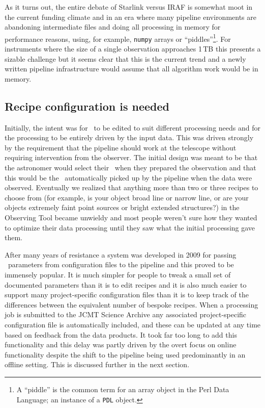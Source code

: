 \documentclass[final,authoryear,5p,times,twocolumn]{elsarticle}
\begin{document}
As it turns out, the entire debate of Starlink versus IRAF is somewhat
moot in the current funding climate and in an era where many pipeline
environments \citep[e.g.,][]{2010SPIE.7740E..15A} are abandoning
intermediate files and doing all processing in memory for performance
reasons, using, for example, \texttt{numpy} arrays or ``piddles''\footnote{A
 ``piddle'' is the common term for an array object in the Perl Data Language;
 an instance of a \texttt{PDL} object.}. For
instruments where the size of a single observation approaches 1\,TB
\citep[e.g., SWCam at CCAT;][]{2014SPIE9153-21} this presents a
sizable challenge but it seems clear that this is the current trend
and a newly written pipeline infrastructure would assume that all
algorithm work would be in memory.

\subsection{Recipe configuration is needed}

Initially, the intent was for \recipes\ to be edited to suit different
processing needs and for the processing to be entirely driven by the
input data. This was driven strongly by the requirement that the
pipeline should work at the telescope without requiring intervention
from the observer. The initial design was meant to be that the
astronomer would select their \recipe\ when they prepared the
observation and that this would be the \recipe\ automatically picked
up by the pipeline when the data were observed. Eventually we realized
that anything more than two or three recipes to choose from (for
example, is your object broad line or narrow line, or are your objects
extremely faint point sources or bright extended structures?) in the
Observing Tool became unwieldy and most people weren't sure how they
wanted to optimize their data processing until they saw what the
initial processing gave them.

After many years of resistance a system was developed in 2009 for
passing \recipe\ parameters from configuration files to the pipeline
and this proved to be immensely popular. It is much simpler for people
to tweak a small set of documented parameters than it is to edit
recipes and it is also much easier to support many project-specific
configuration files than it is to keep track of the differences
between the equivalent number of bespoke recipes. When a processing
job is submitted to the JCMT Science Archive any associated
project-specific configuration file is automatically included, and
these can be updated at any time based on feedback from the data
products. It took far too long to add this functionality and this
delay was partly driven by the overt focus on online functionality
despite the shift to the pipeline being used predominantly in an
offline setting. This is discussed further in the next section.
\end{document}
